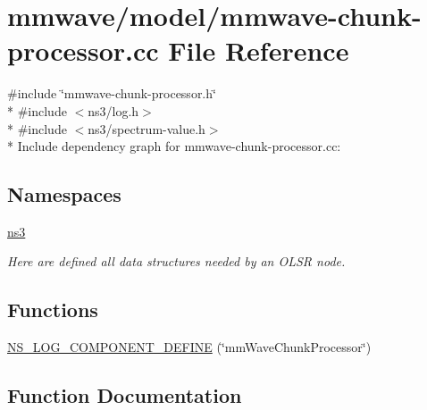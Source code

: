 \hypertarget{mmwave-chunk-processor_8cc}{}\section{mmwave/model/mmwave-\/chunk-\/processor.cc File Reference}
\label{mmwave-chunk-processor_8cc}
{\ttfamily \#include \char`\"{}mmwave-\/chunk-\/processor.\+h\char`\"{}}\\*
{\ttfamily \#include $<$ns3/log.\+h$>$}\\*
{\ttfamily \#include $<$ns3/spectrum-\/value.\+h$>$}\\*
Include dependency graph for mmwave-\/chunk-\/processor.cc\+:
\subsection*{Namespaces}
\begin{DoxyCompactItemize}
\item 
 \hyperlink{namespacens3}{ns3}
\begin{DoxyCompactList}\small\item\em Here are defined all data structures needed by an O\+L\+SR node. \end{DoxyCompactList}\end{DoxyCompactItemize}
\subsection*{Functions}
\begin{DoxyCompactItemize}
\item 
\hyperlink{mmwave-chunk-processor_8cc_adecec4c09063bae896a01411992a2942}{N\+S\+\_\+\+L\+O\+G\+\_\+\+C\+O\+M\+P\+O\+N\+E\+N\+T\+\_\+\+D\+E\+F\+I\+NE} (\char`\"{}mm\+Wave\+Chunk\+Processor\char`\"{})
\end{DoxyCompactItemize}


\subsection{Function Documentation}
